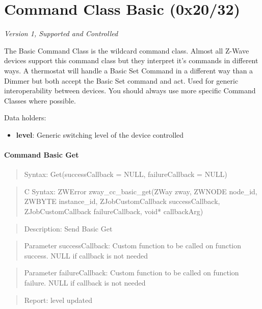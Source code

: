 

\section{Command Class Basic (0x20/32)}

\textit{Version 1, Supported and Controlled}
\newline

The Basic Command Class is the wildcard command class. Almost all Z-Wave devices support this command class but they interpret it's commands in different ways. A thermostat will handle a Basic Set Command in a different way than a Dimmer but both accept the Basic Set command and act. Used for generic interoperability between devices. You should always use more specific Command Classes where possible.
\newline

\noindent
Data holders:

\begin{itemize}
\item \textbf{level}: Generic switching level of the device controlled
\end{itemize}

\paragraph{Command Basic Get}
\begin{quote}Syntax: Get(successCallback = NULL, failureCallback = NULL)\end{quote}
\begin{quote}C Syntax: ZWError zway\_cc\_basic\_get(ZWay zway, ZWNODE node\_id, ZWBYTE instance\_id, ZJobCustomCallback successCallback, ZJobCustomCallback failureCallback, void* callbackArg)\end{quote}
\begin{quote}Description: Send Basic Get\end{quote}
\begin{quote}Parameter successCallback: Custom function to be called on function success. NULL if callback is not needed\end{quote}
\begin{quote}Parameter failureCallback: Custom function to be called on function failure. NULL if callback is not needed\end{quote}
\begin{quote}Report: level updated\end{quote}


